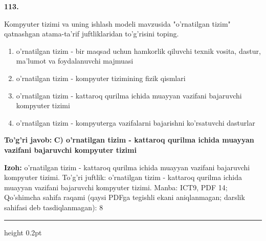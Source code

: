 \documentclass[10pt,a4paper]{article}
\begin{document}
{\bfseries\sffamily\color{ink} 113.}
\par
Kompyuter tizimi va uning ishlash modeli mavzusida "o'rnatilgan tizim" qatnashgan atama-ta'rif juftliklaridan to'g'risini toping.
\begin{enumerate}[label=\Alph*),leftmargin=9mm]
\item o'rnatilgan tizim - bir maqsad uchun hamkorlik qiluvchi texnik vosita, dastur, ma'lumot va foydalanuvchi majmuasi
\item o'rnatilgan tizim - kompyuter tizimining fizik qismlari
\item o'rnatilgan tizim - kattaroq qurilma ichida muayyan vazifani bajaruvchi kompyuter tizimi
\item o'rnatilgan tizim - kompyuterga vazifalarni bajarishni ko'rsatuvchi dasturlar
\end{enumerate}
\begin{tcolorbox}[enhanced,breakable,colback=teal!4,colframe=teal!60!black,boxrule=0.45pt,arc=1.2mm,left=2.7mm,right=2.7mm,top=1.8mm,bottom=1.8mm,before skip=2mm,after skip=2mm]
{\bfseries\sffamily\color{teal}To'g'ri javob:} \textbf{C) o'rnatilgan tizim - kattaroq qurilma ichida muayyan vazifani bajaruvchi kompyuter tizimi}
\par\smallskip
{\bfseries Izoh:} o'rnatilgan tizim - kattaroq qurilma ichida muayyan vazifani bajaruvchi kompyuter tizimi. To'g'ri juftlik: o'rnatilgan tizim - kattaroq qurilma ichida muayyan vazifani bajaruvchi kompyuter tizimi. Manba: ICT9, PDF 14; Qo'shimcha sahifa raqami (qaysi PDFga tegishli ekani aniqlanmagan; darslik sahifasi deb tasdiqlanmagan): 8
\end{tcolorbox}
\vspace{2mm}\hrule height 0.2pt\vspace{3mm}
\end{document}
